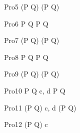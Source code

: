 \begin{circus}
    \circprocess Pro5 \circdef (P \circtimedinterrupt {} \rcirctime Q) \extchoice (P \circtimedinterrupt {} \rcirctime Q) \\
\end{circus}


\begin{circus}
    \circprocess Pro6 \circdef P \circtimedinterrupt {} \rcirctime Q \intchoice P \circtimedinterrupt {} \rcirctime Q \\
\end{circus}
    
\begin{circus}
    \circprocess Pro7 \circdef (P \circtimedinterrupt {} \rcirctime Q) \intchoice (P \circtimedinterrupt {} \rcirctime Q) \\
\end{circus}
    
\begin{circus}
    \circprocess Pro8 \circdef P \circtimedinterrupt {} \rcirctime  Q \interleave P \circtimedinterrupt {} \rcirctime Q \\
\end{circus}

\begin{circus}
    \circprocess Pro9 \circdef (P \circtimedinterrupt {} \rcirctime Q) \interleave (P \circtimedinterrupt {} \rcirctime Q) \\
\end{circus}



\begin{circus}
    \circprocess Pro10 \circdef P \circtimedinterrupt {} \rcirctime  Q \lpar  \lchanset c, d \rchanset  \rpar  P \circtimedinterrupt {} \rcirctime Q \\
\end{circus}

\begin{circus}
    \circprocess Pro11 \circdef (P \circtimedinterrupt {} \rcirctime Q) \lpar  \lchanset c, d \rchanset  \rpar (P \circtimedinterrupt {} \rcirctime Q) \\
\end{circus}


\begin{circus}
    \circprocess Pro12 \circdef (P \circtimedinterrupt {} \rcirctime Q) \circhide c \\
\end{circus} 


